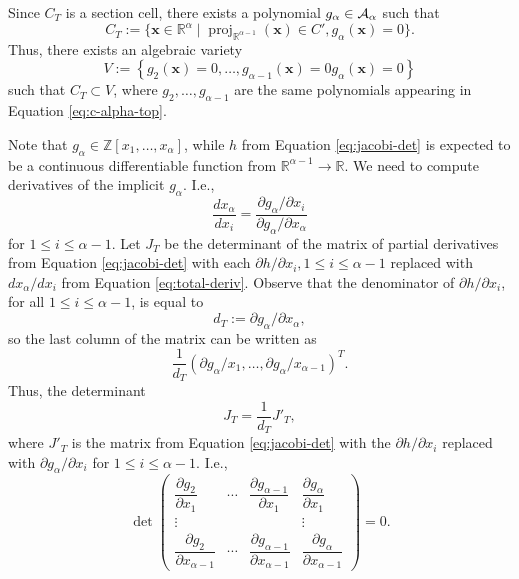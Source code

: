 \documentclass[
]{book}
\theoremstyle{definition}
\theoremstyle{definition}
\theoremstyle{definition}
\theoremstyle{definition}
\theoremstyle{remark}
\begin{document}
Since \(C_T\) is a section cell, there exists a polynomial \(g_\alpha \in {\cal A}_\alpha\) such that \[
C_T := \{ \mathbf{x} \in \mathbb{R}^\alpha \mid {\operatorname{proj}_{\mathbb{R}^{\alpha - 1}}}(\mathbf{x}) \in C', g_\alpha(\mathbf{x}) = 0 \}.
\] Thus, there exists an algebraic variety
\begin{equation}
V := \left\{ g_2(\mathbf{x}) = 0, \ldots, g_{\alpha-1}(\mathbf{x}) = 0 g_\alpha(\mathbf{x}) = 0 \right\}
\label{eq:variety-v}
\end{equation}
such that \(C_T \subset V\), where \(g_2,\ldots,g_{\alpha - 1}\) are the same polynomials appearing in Equation \eqref{eq:c-alpha-top}.

Note that \(g_\alpha \in \mathbb{Z}[x_1,\ldots,x_\alpha]\), while \(h\) from Equation \eqref{eq:jacobi-det} is expected to be a continuous differentiable function from \(\mathbb{R}^{\alpha - 1} \to \mathbb{R}\).
We need to compute derivatives of the implicit \(g_\alpha\). I.e.,
\begin{equation}
\dfrac{d x_\alpha}{d x_i} = \dfrac{\partial g_\alpha / \partial x_i}{\partial g_\alpha / \partial x_\alpha}
\label{eq:total-deriv}
\end{equation}
for \(1\le i \le \alpha - 1\).
Let \(J_T\) be the determinant of the matrix of partial derivatives from Equation \eqref{eq:jacobi-det} with each \(\partial h / \partial x_i, 1 \le i \le \alpha - 1\) replaced with \(d x_\alpha / d x_i\) from Equation \eqref{eq:total-deriv}. Observe that the denominator of \(\partial h / \partial x_i\), for all \(1 \le i \le \alpha - 1\), is equal to
\[d_T := \partial g_\alpha / \partial x_\alpha,\]
so the last column of the matrix can be written as
\[
\dfrac{1}{d_T} \left( \partial g_{\alpha} / x_1 , \ldots , \partial g_{\alpha} / x_{\alpha - 1}\right)^T.
\]
Thus, the determinant
\[
J_T = \frac{1}{d_T} J'_T,
\]
where \(J'_T\) is the matrix from Equation \eqref{eq:jacobi-det} with the \(\partial h / \partial x_i\) replaced with \(\partial g_\alpha / \partial x_i\) for \(1\le i \le \alpha - 1\). I.e.,
\begin{equation}
\det\begin{pmatrix}\dfrac{\partial g_{2}}{\partial x_{1}} & \cdots & \dfrac{\partial g_{\alpha-1}}{\partial x_{1}} & \dfrac{\partial g_\alpha}{\partial x_{1}}\\
\vdots &  &  & \vdots\\
\dfrac{\partial g_{2}}{\partial x_{\alpha-1}} & \cdots & \dfrac{\partial g_{\alpha-1}}{\partial x_{\alpha-1}} & \dfrac{\partial g_\alpha}{\partial x_{\alpha-1}}
\end{pmatrix}=0.
\label{eq:jacobi-det-2}
\end{equation}
\end{document}
